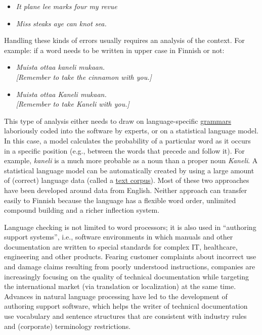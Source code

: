 \documentclass[]{../../metanetpaper}
\begin{document}
\begin{Parallel}[c]{70mm}{70mm}
{\begin{itemize}
\item[] \textit{It plane lee marks four my revue}

\item[] \textit{Miss steaks aye can knot sea.} \cite{Surprise}
\end{itemize}
Handling these kinds of errors usually requires an analysis of the
context. For example: if a word needs to be written in upper case in
Finnish or not:
\begin{itemize}
\item[] {\foreignlanguage{finnish}{\textit{Muista ottaa kaneli mukaan.}}} \\
        \textit{[Remember to take the cinnamon with you.]}
\item[] {\foreignlanguage{finnish}{\textit{Muista ottaa Kaneli mukaan.}}} \\
        \textit{[Remember to take Kaneli with you.]}
\end{itemize}
This type of analysis either needs to draw on language-specific
\underline{grammars} laboriously coded into the software by experts, or on a
statistical language model. In this case, a model calculates the
probability of a particular word as it occurs in a specific position
(e.g., between the words that precede and follow it). For example,
 {\foreignlanguage{finnish}{\textit{kaneli}}} is a much more probable
 as a noun than a proper noun
 {\foreignlanguage{finnish}{\textit{Kaneli}}}.
A statistical language model can be automatically created by using a
large amount of (correct) language data (called a \underline{text corpus}).
Most
of these two approaches have been developed around data from
English. Neither approach can transfer easily to Finnish because the
language has a flexible word order, unlimited compound building and a
richer inflection system.


Language checking is not limited to word processors; it is also used
in “authoring support systems”, i.e., software environments in which
manuals and other documentation are written to special standards for
complex IT, healthcare, engineering and other products. Fearing
customer complaints about incorrect use and damage claims resulting
from poorly understood instructions, companies are increasingly
focusing on the quality of technical documentation while targeting the
international market (via translation or localization) at the same
time. Advances in natural language processing have led to the
development of authoring support software, which helps the writer of
technical documentation use vocabulary and sentence structures that
are consistent with industry rules and (corporate) terminology
restrictions.

}
\end{Parallel}
\end{document}
